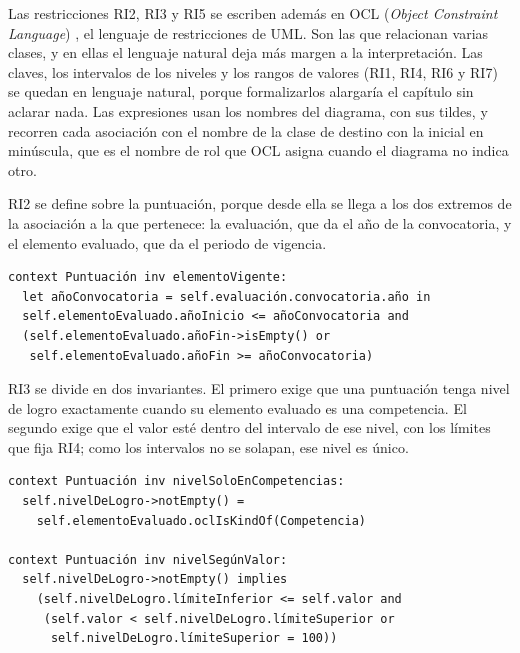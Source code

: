 \documentclass[12pt, a4paper, oneside]{report}
\begin{document}
Las restricciones RI2, RI3 y RI5 se escriben además en OCL (\textit{Object Constraint Language}) \cite{omg_ocl24}, el lenguaje de restricciones de UML. Son las que relacionan varias clases, y en ellas el lenguaje natural deja más margen a la interpretación. Las claves, los intervalos de los niveles y los rangos de valores (RI1, RI4, RI6 y RI7) se quedan en lenguaje natural, porque formalizarlos alargaría el capítulo sin aclarar nada. Las expresiones usan los nombres del diagrama, con sus tildes, y recorren cada asociación con el nombre de la clase de destino con la inicial en minúscula, que es el nombre de rol que OCL asigna cuando el diagrama no indica otro.

RI2 se define sobre la puntuación, porque desde ella se llega a los dos extremos de la asociación a la que pertenece: la evaluación, que da el año de la convocatoria, y el elemento evaluado, que da el periodo de vigencia.

\par\vspace{2ex}\noindent\begin{minipage}{\textwidth}\small{}
\begin{verbatim}
context Puntuación inv elementoVigente:
  let añoConvocatoria = self.evaluación.convocatoria.año in
  self.elementoEvaluado.añoInicio <= añoConvocatoria and
  (self.elementoEvaluado.añoFin->isEmpty() or
   self.elementoEvaluado.añoFin >= añoConvocatoria)
\end{verbatim}
\end{minipage}\par\vspace{2.5ex}

RI3 se divide en dos invariantes. El primero exige que una puntuación tenga nivel de logro exactamente cuando su elemento evaluado es una competencia. El segundo exige que el valor esté dentro del intervalo de ese nivel, con los límites que fija RI4; como los intervalos no se solapan, ese nivel es único.

\par\vspace{2ex}\noindent\begin{minipage}{\textwidth}\small{}
\begin{verbatim}
context Puntuación inv nivelSoloEnCompetencias:
  self.nivelDeLogro->notEmpty() =
    self.elementoEvaluado.oclIsKindOf(Competencia)

context Puntuación inv nivelSegúnValor:
  self.nivelDeLogro->notEmpty() implies
    (self.nivelDeLogro.límiteInferior <= self.valor and
     (self.valor < self.nivelDeLogro.límiteSuperior or
      self.nivelDeLogro.límiteSuperior = 100))
\end{verbatim}
\end{minipage}\par\vspace{2.5ex}
\end{document}
